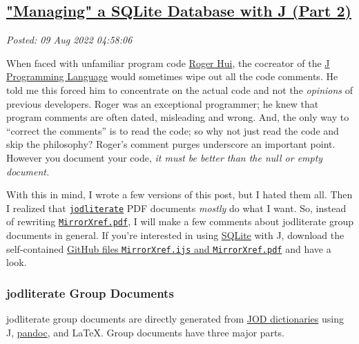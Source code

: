 %

\subsection*{\href{https://analyzethedatanotthedrivel.org/2022/08/08/managing-a-sqlite-database-with-j-part-2/}{"Managing" a SQLite Database with J (Part 2)}}


\noindent\emph{Posted: 09 Aug 2022 04:58:06}
\vspace{6pt}

When faced with unfamiliar program code
\href{https://rogerhui.rip/}{Roger Hui}, the cocreator of the
\href{https://code2.jsoftware.com/wiki/Main_Page}{J Programming
Language} would sometimes wipe out all the code comments. He told me
this forced him to concentrate on the actual code and not the
\emph{opinions} of previous developers. Roger was an exceptional
programmer; he knew that program comments are often dated, misleading
and wrong. And, the only way to ``correct the comments'' is to read the
code; so why not just read the code and skip the philosophy? Roger's
comment purges underscore an important point. However you document your
code, \emph{it must be better than the null or empty document.}

With this in mind, I wrote a few versions of this post, but I hated them
all. Then I realized that
\href{https://github.com/bakerjd99/jacks/blob/master/jodliterate/UsingJodliterate.pdf}{\texttt{jodliterate}}
PDF documents \emph{mostly} do what I want. So, instead of rewriting
\href{https://github.com/bakerjd99/jacks/blob/master/mirrorxref/MirrorXref.pdf}{\texttt{MirrorXref.pdf}},
I will make a few comments about jodliterate group documents in general.
If you're interested in using
\href{https://sqlite.org/index.html}{SQLite} with J, download the
self-contained
\href{https://github.com/bakerjd99/jacks/tree/master/mirrorxref}{GitHub
files \texttt{MirrorXref.ijs} and \texttt{MirrorXref.pdf}} and have a look.

\subsubsection*{jodliterate Group Documents}%

jodliterate group documents are directly generated from
\href{https://analyzethedatanotthedrivel.org/the-jod-page/}{JOD
dictionaries} using J, \href{https://pandoc.org/}{pandoc}, and \LaTeX.
Group documents have three major parts.

